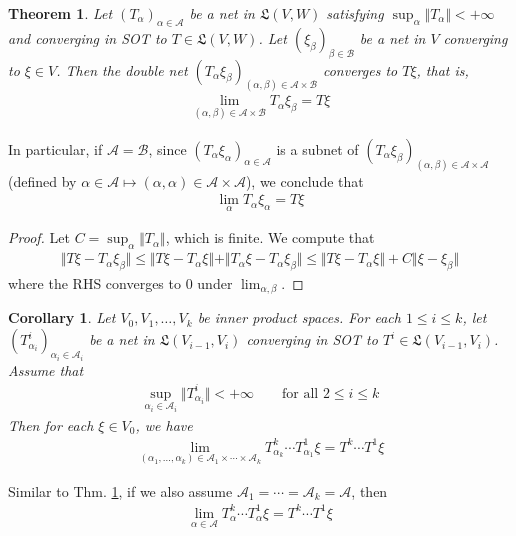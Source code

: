 \documentclass[12pt,b5paper,notitlepage]{article}
\theoremstyle{definition}
\theoremstyle{plain}
\newtheorem{thm}[df]{Theorem}
\newtheorem{co}[df]{Corollary}
\newcommand{\fk}{\mathfrak}
\newcommand{\scr}{\mathscr}
\newcommand{\SA}{\mathscr A}
\numberwithin{equation}{section}
\begin{document}
\begin{thm}\label{lb155}
Let $(T_\alpha)_{\alpha\in\scr A}$ be a net in $\fk L(V,W)$ satisfying $\sup_\alpha\Vert T_\alpha\Vert<+\infty$ and converging in SOT to $T\in\fk L(V,W)$. Let $(\xi_\beta)_{\beta\in\scr B}$ be a net in $V$ converging to $\xi\in V$. Then the double net $(T_\alpha\xi_\beta)_{(\alpha,\beta)\in\scr A\times\scr B}$ converges to $T\xi$, that is,
\begin{align*}
\lim_{(\alpha,\beta)\in\scr A\times\scr B}T_\alpha\xi_\beta=T\xi
\end{align*}
\end{thm}

In particular, if $\scr A=\scr B$, since $(T_\alpha\xi_\alpha)_{\alpha\in\scr A}$ is a subnet of $(T_\alpha\xi_\beta)_{(\alpha,\beta)\in\scr A\times\scr A}$ (defined by $\alpha\in\scr A\mapsto(\alpha,\alpha)\in\SA\times\SA$), we conclude that
\begin{align*}
\lim_\alpha T_\alpha\xi_\alpha=T\xi
\end{align*}

\begin{proof}
Let $C=\sup_\alpha\Vert T_\alpha\Vert$, which is finite. We compute that
\begin{align*}
\Vert T\xi-T_\alpha\xi_\beta\Vert\leq\Vert T\xi-T_\alpha\xi\Vert+\Vert T_\alpha\xi-T_\alpha\xi_\beta\Vert\leq \Vert T\xi-T_\alpha\xi\Vert+C\Vert\xi-\xi_\beta\Vert
\end{align*}
where the RHS converges to $0$ under $\lim_{\alpha,\beta}$.
\end{proof}


\begin{co}\label{lb159}
Let $V_0,V_1,\dots,V_k$ be inner product spaces. For each $1\leq i\leq k$, let $(T^i_{\alpha_i})_{\alpha_i\in\scr A_i}$ be a net in $\fk L(V_{i-1},V_i)$ converging in SOT to $T^i\in\fk L(V_{i-1},V_i)$. Assume that
\begin{align*}
\sup_{\alpha_i\in\scr A_i}\Vert T^i_{\alpha_i}\Vert<+\infty\qquad\text{for all }2\leq i\leq k
\end{align*}
Then for each $\xi\in V_0$, we have
\begin{align*}
\lim_{(\alpha_1,\dots,\alpha_k)\in\scr A_1\times\cdots\times\scr A_k}T^k_{\alpha_k}\cdots T^1_{\alpha_1}\xi= T^k\cdots T^1\xi
\end{align*}
\end{co}

Similar to Thm. \ref{lb155}, if we also assume $\scr A_1=\cdots=\scr A_k=\scr A$, then
\begin{align*}
\lim_{\alpha\in\scr A} T^k_\alpha\cdots T^1_\alpha\xi=T^k\cdots T^1\xi
\end{align*}
\end{document}
